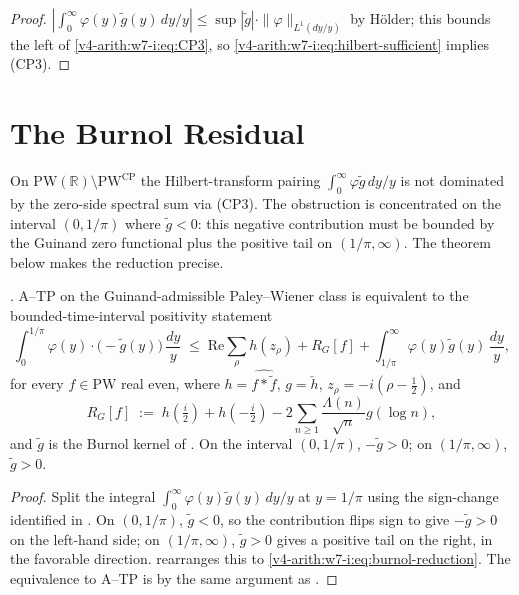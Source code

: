 \begin{proof}
\(\left|\int_{0}^{\infty}\varphi(y)\widetilde g(y)\,dy/y\right|\leq
\sup|\widetilde g|\cdot\|\varphi\|_{L^{1}(dy/y)}\) by H\"older; this
bounds the left of \eqref{v4-arith:w7-i:eq:CP3}, so
\eqref{v4-arith:w7-i:eq:hilbert-sufficient} implies (CP3).
\end{proof}

\section{The Burnol Residual}
\label{v4-arith:w7-i:burnol-residual}

On \(\mathrm{PW}(\mathbb{R})\setminus\mathrm{PW}^{\mathrm{CP}}\) the
Hilbert-transform pairing \(\int_{0}^{\infty}\varphi\widetilde g\,dy/y\)
is not dominated by the zero-side spectral sum via (CP3). The
obstruction is concentrated on the interval \((0,1/\pi)\) where
\(\widetilde g<0\): this negative contribution must be bounded by the
Guinand zero functional plus the positive tail on \((1/\pi,\infty)\). The theorem
below makes the reduction precise.

\begin{theorem}
\label{v4-arith:w7-i:thm:burnol-reduction}
\ClaimStatusProvedHere. A--TP on the Guinand-admissible
Paley--Wiener class is
equivalent to the bounded-time-interval positivity statement
\begin{equation}
\label{v4-arith:w7-i:eq:burnol-reduction}
\int_{0}^{1/\pi}\varphi(y)\cdot\bigl(-\widetilde g(y)\bigr)\,\frac{dy}{y}
\;\leq\;\mathrm{Re}\sum_{\rho}h(z_{\rho})
+R_{G}[f]+\int_{1/\pi}^{\infty}\varphi(y)\widetilde g(y)\,\frac{dy}{y},
\end{equation}
for every \(f\in\mathrm{PW}\) real even, where
\(h=\widehat{f*\widetilde f}\), \(g=\check h\),
\(z_{\rho}=-i(\rho-\tfrac12)\), and
\begin{equation}
R_{G}[f]\;:=\;h(\tfrac{i}{2})+h(-\tfrac{i}{2})
-2\sum_{n\geq 1}\frac{\Lambda(n)}{\sqrt n}g(\log n),
\end{equation}
and \(\widetilde g\) is the Burnol kernel of
. On the interval \((0,1/\pi)\),
\(-\widetilde g>0\); on \((1/\pi,\infty)\), \(\widetilde g>0\).
\end{theorem}

\begin{proof}
Split the integral \(\int_{0}^{\infty}\varphi(y)\widetilde g(y)\,dy/y\)
at \(y=1/\pi\) using the sign-change identified in
. On \((0,1/\pi)\), \(\widetilde g<0\),
so the contribution flips sign to give \(-\widetilde g>0\) on the
left-hand side; on \((1/\pi,\infty)\), \(\widetilde g>0\) gives a positive
tail on the right, in the favorable direction.
 rearranges this to
\eqref{v4-arith:w7-i:eq:burnol-reduction}. The equivalence to A--TP
is by the same argument as .
\end{proof}

